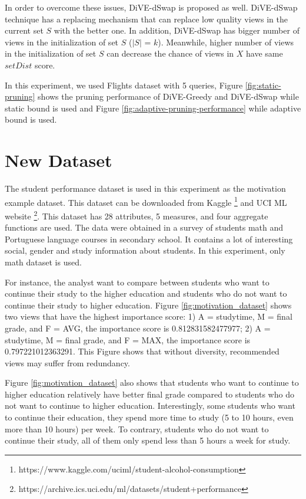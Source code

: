 \documentclass{article}
\begin{document}
In order to overcome these issues, DiVE-dSwap is proposed as well. DiVE-dSwap technique has a replacing mechanism that can replace low quality views in the current set $S$ with the better one. In addition, DiVE-dSwap has bigger number of views in the initialization of set $S$ ($|S|$ = $k$). Meanwhile, higher number of views in the initialization of set $S$ can decrease the chance of views in $X$ have same $ setDist $ score.  


In this experiment, we used Flights dataset with 5 queries, Figure \ref{fig:static-pruning} shows the pruning performance of DiVE-Greedy and DiVE-dSwap while static bound is used and Figure \ref{fig:adaptive-pruning-performance} while adaptive bound is used. 



\section{New Dataset}

The student performance dataset is used in this experiment as the motivation example dataset. This dataset can be downloaded from Kaggle \footnote{https://www.kaggle.com/uciml/student-alcohol-consumption} and UCI ML website \footnote{https://archive.ics.uci.edu/ml/datasets/student+performance}. This dataset has 28 attributes, 5 measures, and four aggregate functions are used. The data were obtained in a survey of students math and Portuguese language courses in secondary school. It contains a lot of interesting social, gender and study information about students. In this experiment, only math dataset is used. 

For instance, the analyst want to compare between students who want to continue their study to the higher education and students who do not want to continue their study to higher education. Figure \ref{fig:motivation_dataset} shows two views that have the highest importance score: 1) A = studytime, M = final grade, and F = AVG, the importance score is 0.812831582477977; 2) A = studytime, M = final grade, and F = MAX, the importance score is 0.797221012363291. This Figure shows that without diversity, recommended views may suffer from redundancy. 


Figure \ref{fig:motivation_dataset} also shows that students who want to continue to higher education relatively have better final grade compared to students who do not want to continue to higher education. Interestingly, some students who want to continue their education, they spend more time to study (5 to 10 hours, even more than 10 hours) per week. To contrary, students who do not want to continue their study, all of them only spend less than 5 hours a week for study.
\end{document}
